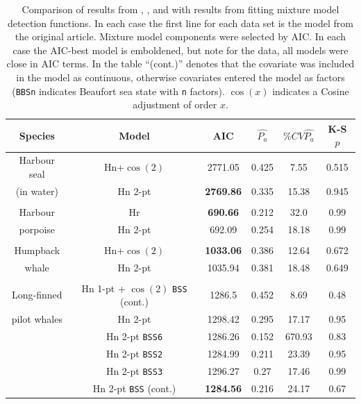 \documentclass[useAMS,referee,usenatbib]{biom}
\begin{document}
\begin{table}
\caption[]{Comparison of results from , ,  and  with results from fitting mixture model detection functions. In each case the first line for each data set is the model from the original article. Mixture model components were selected by AIC. In each case the AIC-best model is emboldened, but note for the  data, all models were close in AIC terms. In the table ``(cont.)'' denotes that the covariate was included in the model as continuous, otherwise covariates entered the model as factors (\texttt{BBSn} indicates Beaufort sea state with \texttt{n} factors). $\cos(x)$ indicates a Cosine adjustment of order $x$. }
\centering
\begin{tabular}{c c c c c c}
\hline \hline
Species & Model & AIC & $\hat{P_a}$ & $\% CV \hat{P_a}$ & K-S $p$\\
\hline
Harbour seal & Hn+$\cos(2)$ & 2771.05 & 0.425 & 7.55 & 0.515\\
(in water) & Hn 2-pt  & \textbf{2769.86} & 0.335 & 15.38 & 0.945\\
&&&&&\\
Harbour & Hr  & \textbf{690.66} & 0.212 & 32.0 & 0.99\\
porpoise & Hn 2-pt & 692.09 & 0.254 & 18.18 & 0.99\\
&&&&&\\
Humpback & Hn+$\cos(2)$ & \textbf{1033.06} & 0.386 & 12.64 & 0.672 \\
whale & Hn 2-pt & 1035.94 & 0.381 & 18.48 & 0.649 \\
&&&&&\\
Long-finned & Hn 1-pt + $\cos(2)$ \texttt{BSS} (cont.) & 1286.5 & 0.452 & 8.69 & 0.48\\ %
pilot whales  & Hn 2-pt &  1298.42  &  0.295  &  17.17  &  0.95 \\
 & Hn 2-pt \texttt{BSS6} &  1286.26  &  0.152  &  670.93  &  0.83 \\
 & Hn 2-pt  \texttt{BSS2}  &  1284.99  &  0.211  &  23.39  &  0.95 \\
 & Hn 2-pt  \texttt{BSS3}  &  1296.27  &  0.27  &  17.46  &  0.99 \\
 & Hn 2-pt  \texttt{BSS} (cont.) &  \textbf{1284.56}  &  0.216  &  24.17  &  0.67 \\

\end{tabular}
\end{table}
\end{document}
